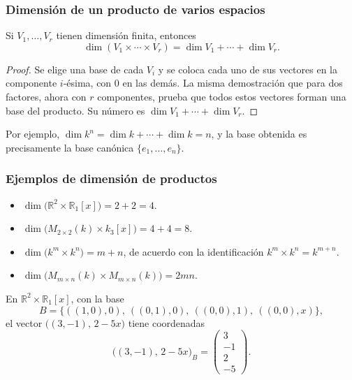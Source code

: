 \begin{frame}
    \frametitle{Dimensión de un producto de varios espacios}

    \begin{corollary}
        Si $V_1,\ldots,V_r$ tienen dimensión finita, entonces
        \[
            \dim(V_1\times\cdots\times V_r)
            =
            \dim V_1+\cdots+\dim V_r.
        \]
    \end{corollary}

    \begin{proof}
        Se elige una base de cada $V_i$ y se coloca cada uno de sus vectores
        en la componente $i$-ésima, con $0$ en las demás. La misma
        demostración que para dos factores, ahora con $r$ componentes,
        prueba que todos estos vectores forman una base del producto.
        Su número es $\dim V_1+\cdots+\dim V_r$.
    \end{proof}

    \medskip

    Por ejemplo, $\dim k^n=\dim k+\cdots+\dim k=n$, y la base obtenida
    es precisamente la base canónica $\{e_1,\ldots,e_n\}$.
\end{frame}


\begin{frame}
    \frametitle{Ejemplos de dimensión de productos}

    \begin{example}
        \begin{itemize}
            \item $\dim\bigl(\mathbb{R}^2\times\mathbb{R}_1[x]\bigr)=2+2=4$.
            \item $\dim\bigl(M_{2\times2}(k)\times k_3[x]\bigr)=4+4=8$.
            \item $\dim\bigl(k^m\times k^n\bigr)=m+n$, de acuerdo con la
                  identificación $k^m\times k^n=k^{m+n}$.
            \item $\dim\bigl(M_{m\times n}(k)\times M_{m\times n}(k)\bigr)=2mn$.
        \end{itemize}
    \end{example}

    En $\mathbb{R}^2\times\mathbb{R}_1[x]$, con la base
    \[
        B=\bigl\{((1,0),0),\ ((0,1),0),\ ((0,0),1),\ ((0,0),x)\bigr\},
    \]
    el vector $\bigl((3,-1),\,2-5x\bigr)$ tiene coordenadas
    \[
        \bigl((3,-1),\,2-5x\bigr)_B
        =
        \begin{pmatrix}3\\-1\\2\\-5\end{pmatrix}.
    \]
\end{frame}



